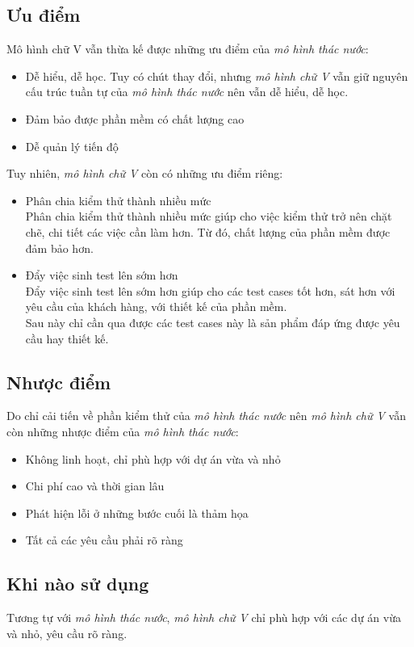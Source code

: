\documentclass[14pt]{extarticle}
\begin{document}
\subsection{Ưu điểm}
Mô hình chữ V vẫn thừa kế được những ưu điểm của \textit{mô hình thác nước}:
\begin{itemize}
  \item Dễ hiểu, dễ học. Tuy có chút thay đổi, nhưng \textit{mô hình chữ V} vẫn
        giữ nguyên cấu trúc tuần tự của \textit{mô hình thác nước} nên vẫn dễ hiểu, dễ học.

  \item Đảm bảo được phần mềm có chất lượng cao
  \item Dễ quản lý tiến độ
\end{itemize}
Tuy nhiên, \textit{mô hình chữ V} còn có những ưu điểm riêng:
\begin{itemize}
  \item Phân chia kiểm thử thành nhiều mức\\
        Phân chia kiểm thử thành nhiều mức giúp cho việc kiểm thử trở nên chặt chẽ,
        chi tiết các việc cần làm hơn. Từ đó, chất lượng của phần mềm được đảm bảo
        hơn.
  \item Đẩy việc sinh test lên sớm hơn\\
        Đẩy việc sinh test lên sớm hơn giúp cho các test cases tốt hơn, sát hơn với
        yêu cầu của khách hàng, với thiết kế của phần mềm.\\
        Sau này chỉ cần qua được các test cases này là sản phẩm đáp ứng được yêu cầu hay
        thiết kế.
\end{itemize}
\subsection{Nhược điểm}
Do chỉ cải tiến về phần kiểm thử của \textit{mô hình thác nước} nên \textit{mô hình chữ V}
vẫn còn những nhược điểm của \textit{mô hình thác nước}:
\begin{itemize}
\item {Không linh hoạt, chỉ phù hợp với dự án vừa và nhỏ}
\item{Chi phí cao và thời gian lâu}
\item{Phát hiện lỗi ở những bước cuối là thảm họa}
\item{Tất cả các yêu cầu phải rõ ràng}
\end {itemize}
\subsection{Khi nào sử dụng}
Tương tự với \textit{mô hình thác nước}, \textit{mô hình chữ V} chỉ phù hợp với các dự án vừa và nhỏ,
yêu cầu rõ ràng.\\
\end{document}
